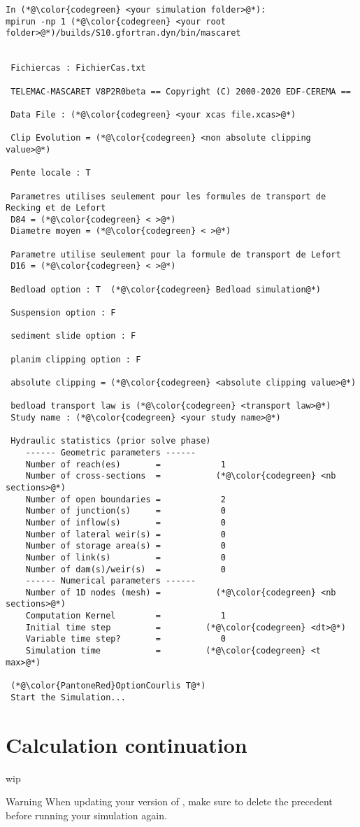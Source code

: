 \begin{lstlisting}
In (*@\color{codegreen} <your simulation folder>@*):
mpirun -np 1 (*@\color{codegreen} <your root folder>@*)/builds/S10.gfortran.dyn/bin/mascaret


 Fichiercas : FichierCas.txt

 TELEMAC-MASCARET V8P2R0beta == Copyright (C) 2000-2020 EDF-CEREMA ==

 Data File : (*@\color{codegreen} <your xcas file.xcas>@*)

 Clip Evolution = (*@\color{codegreen} <non absolute clipping value>@*)

 Pente locale : T

 Parametres utilises seulement pour les formules de transport de Recking et de Lefort
 D84 = (*@\color{codegreen} < >@*)
 Diametre moyen = (*@\color{codegreen} < >@*)

 Parametre utilise seulement pour la formule de transport de Lefort
 D16 = (*@\color{codegreen} < >@*)

 Bedload option : T  (*@\color{codegreen} Bedload simulation@*)

 Suspension option : F

 sediment slide option : F

 planim clipping option : F

 absolute clipping = (*@\color{codegreen} <absolute clipping value>@*)

 bedload transport law is (*@\color{codegreen} <transport law>@*)
 Study name : (*@\color{codegreen} <your study name>@*)

 Hydraulic statistics (prior solve phase)
    ------ Geometric parameters ------
    Number of reach(es)       =            1
    Number of cross-sections  =           (*@\color{codegreen} <nb sections>@*)
    Number of open boundaries =            2
    Number of junction(s)     =            0
    Number of inflow(s)       =            0
    Number of lateral weir(s) =            0
    Number of storage area(s) =            0
    Number of link(s)         =            0
    Number of dam(s)/weir(s)  =            0
    ------ Numerical parameters ------
    Number of 1D nodes (mesh) =           (*@\color{codegreen} <nb sections>@*)
    Computation Kernel        =            1
    Initial time step         =      	(*@\color{codegreen} <dt>@*)
    Variable time step?       =            0
    Simulation time           =      	(*@\color{codegreen} <t max>@*)

 (*@\color{PantoneRed}OptionCourlis T@*)
 Start the Simulation...
\end{lstlisting}

\section{Calculation continuation}

wip


\begin{WarningBlock}{Warning}
	When updating your version of \courlis, make sure to delete the precedent  before running your simulation again.
\end{WarningBlock}

